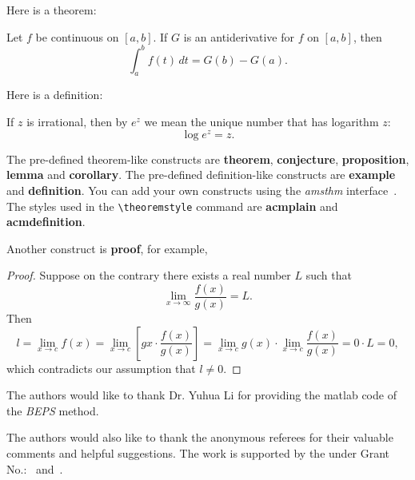 \documentclass[sigconf]{acmart}
\begin{document}
Here is a theorem:
\begin{theorem}
  Let $f$ be continuous on $[a,b]$.  If $G$ is
  an antiderivative for $f$ on $[a,b]$, then
  \begin{displaymath}
    \int^b_af(t)\,dt = G(b) - G(a).
  \end{displaymath}
\end{theorem}

Here is a definition:
\begin{definition}
  If $z$ is irrational, then by $e^z$ we mean the
  unique number that has
  logarithm $z$:
  \begin{displaymath}
    \log e^z = z.
  \end{displaymath}
\end{definition}

The pre-defined theorem-like constructs are \textbf{theorem},
\textbf{conjecture}, \textbf{proposition}, \textbf{lemma} and
\textbf{corollary}.  The pre-defined de\-fi\-ni\-ti\-on-like constructs are
\textbf{example} and \textbf{definition}.  You can add your own
constructs using the \textsl{amsthm} interface~\cite{Amsthm15}.  The
styles used in the \verb|\theoremstyle| command are \textbf{acmplain}
and \textbf{acmdefinition}.

Another construct is \textbf{proof}, for example,

\begin{proof}
  Suppose on the contrary there exists a real number $L$ such that
  \begin{displaymath}
    \lim_{x\rightarrow\infty} \frac{f(x)}{g(x)} = L.
  \end{displaymath}
  Then
  \begin{displaymath}
    l=\lim_{x\rightarrow c} f(x)
    = \lim_{x\rightarrow c}
    \left[ g{x} \cdot \frac{f(x)}{g(x)} \right ]
    = \lim_{x\rightarrow c} g(x) \cdot \lim_{x\rightarrow c}
    \frac{f(x)}{g(x)} = 0\cdot L = 0,
  \end{displaymath}
  which contradicts our assumption that $l\neq 0$.
\end{proof}

\appendix
\begin{acks}
  The authors would like to thank Dr. Yuhua Li for providing the
  matlab code of  the \textit{BEPS} method. 

  The authors would also like to thank the anonymous referees for
  their valuable comments and helpful suggestions. The work is
  supported by the  under Grant
  No.:~
  and~.

\end{acks}



 
\end{document}
